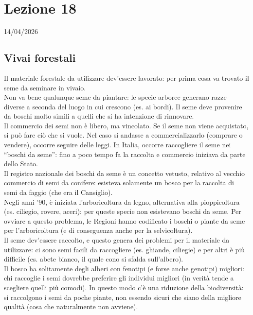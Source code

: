 \section{Lezione 18} \hfill 14/04/2026
\subsection{Vivai forestali}
Il materiale forestale da utilizzare dev'essere lavorato: per prima cosa va trovato il seme da seminare in vivaio.\\
Non va bene qualunque seme da piantare: le specie arboree generano razze diverse a seconda del luogo in cui crescono (es. ai bordi). Il seme deve provenire da boschi molto simili a quelli che si ha intenzione di rinnovare.\\
Il commercio dei semi non è libero, ma vincolato. Se il seme non viene acquistato, si può fare ciò che si vuole. Nel caso si andasse a commercializzarlo (comprare o vendere), occorre seguire delle leggi. In Italia, occorre raccogliere il seme nei ``boschi da seme'': fino a poco tempo fa la raccolta e commercio iniziava da parte dello Stato.\\
Il registro nazionale dei boschi da seme è un concetto vetusto, relativo al vecchio commercio di semi da conifere: esisteva solamente un bosco per la raccolta di semi da faggio (che era il Cansiglio).\\
Negli anni '90, è iniziata l'arboricoltura da legno, alternativa alla pioppicoltura (es. ciliegio, rovere, aceri): per queste specie non esistevano boschi da seme. Per ovviare a questo problema, le Regioni hanno codificato i boschi o piante da seme per l'arboricoltura (e di conseguenza anche per la selvicoltura).\\
Il seme dev'essere raccolto, e questo genera dei problemi per il materiale da utilizzare: ci sono semi facili da raccogliere (es. ghiande, ciliegie) e per altri è più difficile (es. abete bianco, il quale cono si sfalda sull'albero).\\
Il bosco ha solitamente degli alberi con fenotipi (e forse anche genotipi) migliori: chi raccoglie i semi dovrebbe preferire gli individui migliori (in verità tende a scegliere quelli più comodi). In questo modo c'è una riduzione della biodiversità: si raccolgono i semi da poche piante, non essendo sicuri che siano della migliore qualità (cosa che naturalmente non avviene).\\

